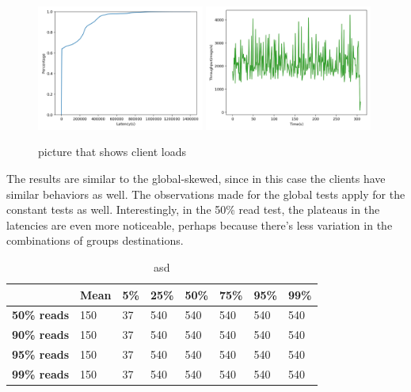 \begin{figure}[!htb]
  \centering
  \includegraphics[width=0.49\textwidth,height=\textheight,keepaspectratio]{img/constant1_lat.png}
  \includegraphics[width=0.49\textwidth,height=\textheight,keepaspectratio]{img/constant1_tp.png}
  \caption[caption]{ picture that shows client loads }
  \label{fig:constant1-performance}
\end{figure}

The results are similar to the global-skewed, since in this case the clients have similar behaviors as well. The observations made for the global tests apply for the constant tests as well. Interestingly, in the 50\% read test, the plateaus in the latencies are even more noticeable, perhaps because there's less variation in the combinations of groups destinations.

\begin{table}[!htb]
  \centering
  \begin{tabular}{l l l l l l l l}
    \hline
    & \textbf{Mean} & \textbf{5\%} & \textbf{25\%} & \textbf{50\%} & \textbf{75\%} & \textbf{95\%}& \textbf{99\%} \\
    \hline
    \textbf{50\% reads} & 150 & 37 & 540 & 540 & 540 & 540 & 540 \\
    \textbf{90\% reads} & 150 & 37 & 540 & 540 & 540 & 540 & 540 \\
    \textbf{95\% reads} & 150 & 37 & 540 & 540 & 540 & 540 & 540 \\
    \textbf{99\% reads} & 150 & 37 & 540 & 540 & 540 & 540 & 540 \\
    \hline
  \end{tabular}
  \caption{asd}\label{tab:local-latencies-table}
\end{table}

